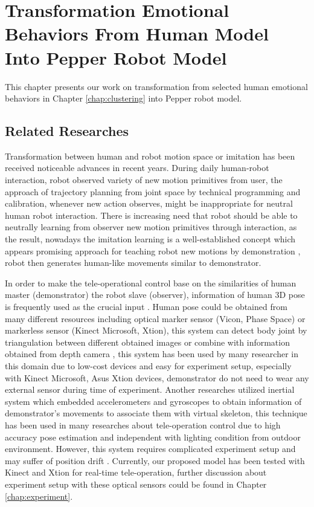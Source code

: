 \chapter{Transformation Emotional Behaviors From Human Model Into Pepper Robot Model}
\label{chap:transformation}

This chapter presents our work on transformation from selected human emotional behaviors in Chapter \ref{chap:clustering} into Pepper robot model. 

\section{Related Researches}

Transformation between human and robot motion space or imitation has been received noticeable advances in recent years. During daily human-robot interaction, robot observed variety of new motion primitives from user, the approach of trajectory planning from joint space by technical programming and calibration, whenever new action observes, might be inappropriate for neutral human robot interaction. There is increasing need that robot should be able to neutrally learning from observer new motion primitives through interaction, as the result, nowadays the imitation learning is a well-established concept which appears promising approach for teaching robot new motions by demonstration \cite{argall2009survey}, robot then generates human-like movements similar to demonstrator. 

In order to make the tele-operational control base on the similarities of human master (demonstrator) the robot slave (observer), information of human 3D pose is frequently used as the crucial input . Human pose could be obtained from many different resources including optical marker sensor (Vicon, Phase Space) or markerless sensor (Kinect Microsoft, Xtion), this system can detect body joint by triangulation between different obtained images or combine with information obtained from depth camera \cite{regazzoni2014rgb}, this system has been used by many researcher in this domain \cite{rosado2014using}\cite{zuher2012recognition}due to low-cost devices and easy for experiment setup, especially with Kinect Microsoft, Asus Xtion devices, demonstrator do not need to wear any external sensor during time of experiment. Another researches utilized inertial system which embedded accelerometers and gyroscopes to obtain information of demonstrator's movements to associate them with virtual skeleton, this technique has been used in many researches about tele-operation control \cite{stanton2012teleoperation}\cite{van2015development} due to high accuracy pose estimation and independent with lighting condition from outdoor environment. However, this system requires complicated experiment setup and may suffer of position drift \cite{vlasic2007practical}. Currently, our proposed model has been tested with Kinect and Xtion for real-time tele-operation, further discussion about experiment setup with these optical sensors could be found in Chapter \ref{chap:experiment}.


